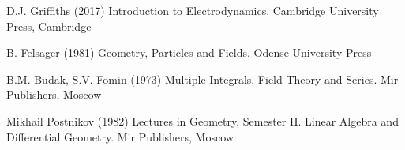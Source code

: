 % 
%

%
% 
% 
%
\begin{thebibliography}{99.}
%
%
%
 D.J. Griffiths (2017)
Introduction to Electrodynamics. Cambridge University Press, Cambridge

 B. Felsager (1981)
Geometry, Particles and Fields. Odense University Press

 B.M. Budak, S.V. Fomin (1973)
Multiple Integrals, Field Theory and Series. Mir Publishers, Moscow

 Mikhail Postnikov (1982)
Lectures in Geometry, Semester II. Linear Algebra and Differential Geometry. Mir Publishers, Moscow

\end{thebibliography}
